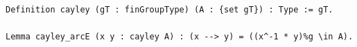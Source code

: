 \begin{lstlisting}[language=Rocq]
Definition cayley (gT : finGroupType) (A : {set gT}) : Type := gT.

Lemma cayley_arcE (x y : cayley A) : (x --> y) = ((x^-1 * y)%g \in A).
\end{lstlisting}
